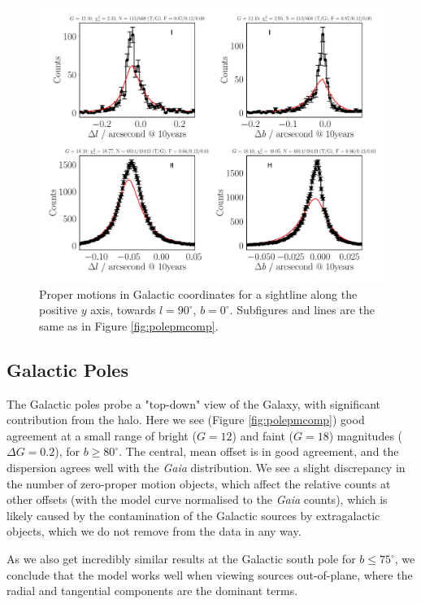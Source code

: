 \documentclass[fleqn,usenatbib]{mnras}
\begin{document}
\begin{figure}
    \centering
    \includegraphics[width=\columnwidth]{Plots/plots_pm_gaia_90_0.pdf}
    \caption{Proper motions in Galactic coordinates for a sightline along the positive $y$ axis, towards $l = 90^\circ$, $b = 0^\circ$. Subfigures and lines are the same as in Figure \ref{fig:polepmcomp}.}
    \label{fig:l90comp}
\end{figure}

\subsection{Galactic Poles}
The Galactic poles probe a "top-down" view of the Galaxy, with significant contribution from the halo. Here we see (Figure \ref{fig:polepmcomp}) good agreement at a small range of bright ($G=12$) and faint ($G=18$) magnitudes ($\Delta G = 0.2$), for $b \geq 80^\circ$. The central, mean offset is in good agreement, and the dispersion agrees well with the \textit{Gaia} distribution. We see a slight discrepancy in the number of zero-proper motion objects, which affect the relative counts at other offsets (with the model curve normalised to the \textit{Gaia} counts), which is likely caused by the contamination of the Galactic sources by extragalactic objects, which we do not remove from the data in any way.

As we also get incredibly similar results at the Galactic south pole for $b \leq 75^\circ$, we conclude that the model works well when viewing sources out-of-plane, where the radial and tangential components are the dominant terms.
\end{document}
